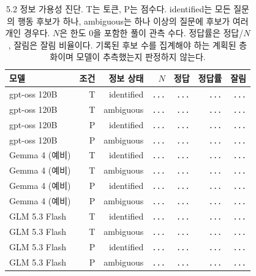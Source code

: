 \begin{table}[H]
\centering\footnotesize
\setlength{\tabcolsep}{4pt}
\caption{5.2 정보 가용성 진단. T는 토큰, P는 점수다. identified는 모든 질문의 행동 후보가 하나, ambiguous는 하나 이상의 질문에 후보가 여러 개인 경우다. $N$은 한도 0을 포함한 풀이 관측 수다. 정답률은 정답/$N$, 잘림은 잘림 비율이다. 기록된 후보 수를 집계해야 하는 계획된 층화이며 모델이 추측했는지 판정하지 않는다.}
\label{tab:information-results}
\begin{tabular}{@{}lrrrrrr@{}}
\toprule
모델 & 조건 & 정보 상태 & $N$ & 정답 & 정답률 & 잘림 \\
\midrule
gpt-oss 120B & T & identified & {\color{gray}\texttt{...}} & {\color{gray}\texttt{...}} & {\color{gray}\texttt{...}} & {\color{gray}\texttt{...}} \\
gpt-oss 120B & T & ambiguous & {\color{gray}\texttt{...}} & {\color{gray}\texttt{...}} & {\color{gray}\texttt{...}} & {\color{gray}\texttt{...}} \\
gpt-oss 120B & P & identified & {\color{gray}\texttt{...}} & {\color{gray}\texttt{...}} & {\color{gray}\texttt{...}} & {\color{gray}\texttt{...}} \\
gpt-oss 120B & P & ambiguous & {\color{gray}\texttt{...}} & {\color{gray}\texttt{...}} & {\color{gray}\texttt{...}} & {\color{gray}\texttt{...}} \\
Gemma 4 (예비) & T & identified & {\color{gray}\texttt{...}} & {\color{gray}\texttt{...}} & {\color{gray}\texttt{...}} & {\color{gray}\texttt{...}} \\
Gemma 4 (예비) & T & ambiguous & {\color{gray}\texttt{...}} & {\color{gray}\texttt{...}} & {\color{gray}\texttt{...}} & {\color{gray}\texttt{...}} \\
Gemma 4 (예비) & P & identified & {\color{gray}\texttt{...}} & {\color{gray}\texttt{...}} & {\color{gray}\texttt{...}} & {\color{gray}\texttt{...}} \\
Gemma 4 (예비) & P & ambiguous & {\color{gray}\texttt{...}} & {\color{gray}\texttt{...}} & {\color{gray}\texttt{...}} & {\color{gray}\texttt{...}} \\
GLM 5.3 Flash & T & identified & {\color{gray}\texttt{...}} & {\color{gray}\texttt{...}} & {\color{gray}\texttt{...}} & {\color{gray}\texttt{...}} \\
GLM 5.3 Flash & T & ambiguous & {\color{gray}\texttt{...}} & {\color{gray}\texttt{...}} & {\color{gray}\texttt{...}} & {\color{gray}\texttt{...}} \\
GLM 5.3 Flash & P & identified & {\color{gray}\texttt{...}} & {\color{gray}\texttt{...}} & {\color{gray}\texttt{...}} & {\color{gray}\texttt{...}} \\
GLM 5.3 Flash & P & ambiguous & {\color{gray}\texttt{...}} & {\color{gray}\texttt{...}} & {\color{gray}\texttt{...}} & {\color{gray}\texttt{...}} \\
\bottomrule
\end{tabular}
\end{table}
